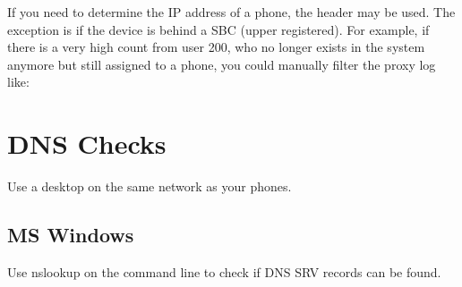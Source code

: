 \documentclass[letterpaper,10pt,english]{sphinxmanual}
\begin{document}
If you need to determine the IP address of a phone, the  header may be used.
The exception is if the device is behind a SBC (upper registered).
For example, if there is a very high  count from user 200, who no longer exists in the system anymore but still assigned to a phone, you could manually filter the proxy log like:

\begin{sphinxVerbatim}[commandchars=\\\{\}]
                           
\end{sphinxVerbatim}


\section{DNS Checks}
\label{\detokenize{troubleshooting:dns-checks}}\label{\detokenize{troubleshooting:id3}}
Use a desktop on the same network as your phones.


\subsection{MS Windows}
\label{\detokenize{troubleshooting:ms-windows}}
Use nslookup on the command line to check if DNS SRV records can be found.
\end{document}
